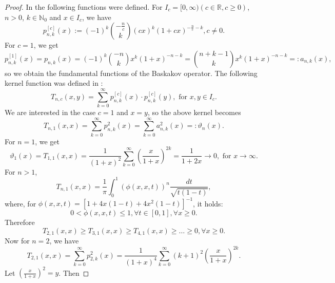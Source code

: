 \documentclass[12pt,leqno,a4paper,dvips,twoside]{article}
\newcommand*{\N}{\ensuremath{\mathbb{N}}}               %
\newcommand*{\R}{\ensuremath{\mathbb{R}}}               %
\begin{document}
{\begin{proof}
	In \cite{berdysheva:2007} the following functions were defined. 
	For $I_c=[0,\infty) (c\in \R, c\geq 0)$, $n>0$, $k\in\N_0$ and $x\in I_c$, we have
		\begin{equation*}
			p^{[c]}_{n,k}(x):=(-1)^k\binom{-\frac{n}{c}}{k}(cx)^k(1+cx)^{-\frac{n}{c}-k}, c\neq 0. 
		\end{equation*}
	For $c=1$, we get
		\begin{equation*}
			p^{[1]}_{n,k}(x)=p_{n,k}(x)=(-1)^k\binom{-n}{k}x^k(1+x)^{-n-k}
			=\binom{n+k-1}{k}x^k(1+x)^{-n-k}=:a_{n,k}(x),
		\end{equation*}
	so we obtain the fundamental functions of the Baskakov operator.
	The following kernel function was defined in \cite{berdysheva:2007}:
		\begin{equation*}
			T_{n,c}(x,y)=\sum^{\infty}_{k=0}{p^{[c]}_{n,k}(x)\cdot p^{[c]}_{n,k}(y)}, \text{ for } x,y\in I_c.
		\end{equation*}
	We are interested in the case $c=1$ and $x=y$, so the above kernel becomes
		\begin{equation}
			T_{n,1}(x,x)=\sum^{\infty}_{k=0}{p^2_{n,k}(x)}=\sum^{\infty}_{k=0}{a^2_{n,k}(x)}=:\vartheta_n(x).
		\end{equation}
	For $n=1$, we get 
	\begin{equation*}		
		\vartheta_1(x)=T_{1,1}(x,x)=\frac{1}{(1+x)^2}\sum^{\infty}_{k=0}{\left(\frac{x}{1+x}\right)^{2k}}
		=\frac{1}{1+2x} \longrightarrow 0, \text{ for }x\to \infty.
	\end{equation*}
	For $n>1$, 
		\begin{equation*}
			T_{n,1}(x,x)=\frac{1}{\pi}\int^{1}_{0}{(\phi (x,x,t))^n\frac{dt}{\sqrt{t(1-t)}}},
		\end{equation*}
	where, for $\phi(x,x,t)=[1+4x(1-t)+4x^2(1-t)]^{-1}$, it holds:
		\begin{equation*}
			0<\phi(x,x,t)\leq 1, \forall t\in [0,1], \forall x\geq 0.
		\end{equation*}
	Therefore
		\begin{equation}\label{eq*}
			T_{2,1}(x,x)\geq T_{3,1}(x,x)\geq T_{4,1}(x,x)\geq \ldots \geq 0, \forall x\geq 0.
		\end{equation}
	Now for $n=2$, we have
		\begin{equation*}
			T_{2,1}(x,x)=\sum^{\infty}_{k=0}{p^2_{2,k}(x)}=\frac{1}{(1+x)^4}\sum^{\infty}_{k=0}{(k+1)^2\left(\frac{x}{1+x}\right)^{2k}}.
		\end{equation*}
	Let $\left(\frac{x}{1+x}\right)^2=y$. Then

\end{proof}}
\end{document}
